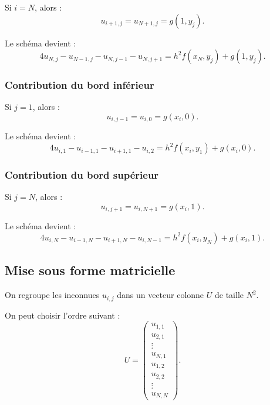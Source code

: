 \documentclass[12pt,a4paper]{article}
\begin{document}
	Si \(i=N\), alors :
	\begin{equation*}
	u_{i+1,j}=u_{N+1,j}=g(1,y_j).
	\end{equation*}
	
	Le schéma devient :
	\begin{equation*}
	4u_{N,j}
	-
	u_{N-1,j}
	-
	u_{N,j-1}
	-
	u_{N,j+1}
	=
	h^2 f(x_N,y_j)
	+
	g(1,y_j).
	\end{equation*}
	
	\subsubsection*{Contribution du bord inférieur}
	
	Si \(j=1\), alors :
	\begin{equation*}
	u_{i,j-1}=u_{i,0}=g(x_i,0).
	\end{equation*}
	
	Le schéma devient :
	\begin{equation*}
	4u_{i,1}
	-
	u_{i-1,1}
	-
	u_{i+1,1}
	-
	u_{i,2}
	=
	h^2 f(x_i,y_1)
	+
	g(x_i,0).
	\end{equation*}
	
	\subsubsection*{Contribution du bord supérieur}
	
	Si \(j=N\), alors :
	\begin{equation*}
	u_{i,j+1}=u_{i,N+1}=g(x_i,1).
	\end{equation*}
	
	Le schéma devient :
	\begin{equation*}
	4u_{i,N}
	-
	u_{i-1,N}
	-
	u_{i+1,N}
	-
	u_{i,N-1}
	=
	h^2 f(x_i,y_N)
	+
	g(x_i,1).
	\end{equation*}
	

	\subsection{Mise sous forme matricielle}
	
	On regroupe les inconnues \(u_{i,j}\) dans un vecteur colonne \(U\) de taille \(N^2\).
	
	On peut choisir l'ordre suivant :
	\begin{equation*}
	U=
	\begin{pmatrix}
	u_{1,1}\\
	u_{2,1}\\
	\vdots\\
	u_{N,1}\\
	u_{1,2}\\
	u_{2,2}\\
	\vdots\\
	u_{N,N}
	\end{pmatrix}.
	\end{equation*}
	
\end{document}
